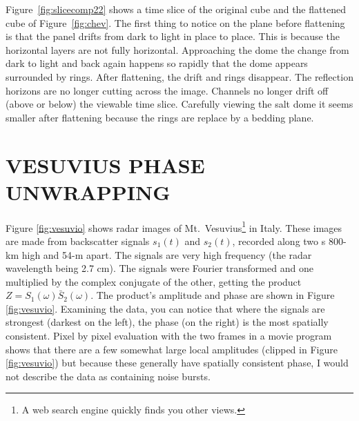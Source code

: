 \par
Figure~\ref{fig:slicecomp22} shows a time slice of the original cube
and the flattened cube of Figure~\ref{fig:chev}.
The first thing to notice on the plane before flattening is that the panel 
drifts from dark to light in place to place.
This is because the horizontal layers are not fully horizontal.
Approaching the dome the change from dark to light and 
back again happens so rapidly that the dome appears surrounded by rings.
After flattening, the drift and rings disappear.
The reflection horizons are no longer cutting across the image.
Channels no longer drift off (above or below) the viewable time slice.
Carefully viewing the salt dome it seems smaller after flattening because the 
rings are replace by a bedding plane.
%

%
%

\section{VESUVIUS PHASE UNWRAPPING}
Figure \ref{fig:vesuvio} shows
radar images of
Mt.~Vesuvius\footnote{
        A web search engine quickly finds you other views.
        }
in Italy.
These images are made from backscatter
signals $s_1(t)$ and $s_2(t)$,
recorded along two s 800-km high and 54-m apart.
The signals are very high frequency
(the radar wavelength being 2.7 cm).
The signals were Fourier transformed
and one multiplied by the complex conjugate of the other,
getting the product $Z=S_1(\omega) \bar S_2(\omega)$.
The product's amplitude and phase are shown in Figure \ref{fig:vesuvio}.
Examining the data,
you can notice that where the signals are strongest (darkest on the left),
the phase (on the right)
is the most spatially consistent.
Pixel by pixel evaluation with the two frames in a movie program
shows that there are a few somewhat large local amplitudes
(clipped in Figure \ref{fig:vesuvio})
but because these generally have spatially consistent phase,
I would not describe the data as containing noise bursts.

